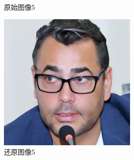 \begin{figure}[H]
\begin{minipage}[b]{0.3\linewidth}
    \caption{原始图像5}
    \label{original image }
  \end{minipage}
\hspace{0.1cm}
  \begin{minipage}[b]{0.3\linewidth}
    \includegraphics[width=\linewidth]{Picture/recon/00005.png}
    \caption{还原图像5}
    \label{inpainted image}
  \end{minipage}
\end{figure}

